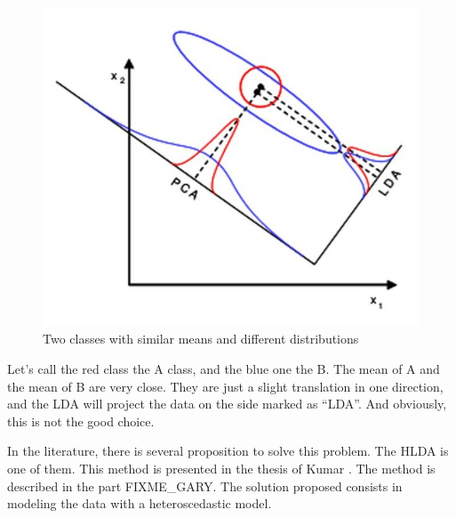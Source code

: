 \begin{figure}[h]
  \centering
  \includegraphics[scale=0.5]{img/limitation_lda}
  \caption{Two classes with similar means and different distributions}
  \label{fig:lda-fail}
\end{figure}

Let's call the red class the A class, and the blue one the B. The mean
of A and the mean of B are very close. They are just a slight
translation in one direction, and the LDA will project the data on the
side marked as ``LDA''. And obviously, this is not the good choice.

In the literature, there is several proposition to solve this problem.
The HLDA is one of them. This method is presented in the thesis of
Kumar \cite{kumar.1997}. The method is described in the part
FIXME\_GARY. The solution proposed consists in modeling the data with a
heteroscedastic model.

